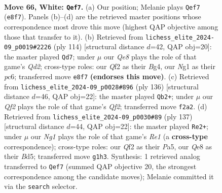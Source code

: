 \documentclass[11pt]{article}
\begin{document}
\clearpage

\begin{figure}[p]\centering
\begin{subfigure}{0.46\textwidth}\centering
\resizebox{\linewidth}{!}{%
\newchessgame
\chessboard[
  setfen={4Q3/8/p7/3P2kp/2N3p1/8/5Q2/5KN1 w - - 1 66},
  showmover=false,
  pgfstyle=straightmove, color=movearrow, markmove={e8-f7}
]}
\caption{}
\end{subfigure}\hfill
\begin{subfigure}{0.46\textwidth}\centering
\resizebox{\linewidth}{!}{%
\newchessgame
\chessboard[
  setfen={5b2/1p5P/1kp5/p5K1/P5B1/8/3Q4/8 w - - 1 58},
  showmover=false,
  pgfstyle=straightmove, color=movearrow, markmove={d2-d7}
]}
\caption{}
\end{subfigure}
\\[4pt]
\begin{subfigure}{0.46\textwidth}\centering
\resizebox{\linewidth}{!}{%
\newchessgame
\chessboard[
  setfen={8/1k4p1/5np1/8/P1q2P2/5N2/5QK1/8 w - - 21 69},
  showmover=false,
  pgfstyle=straightmove, color=movearrow, markmove={f2-b2}
]}
\caption{}
\end{subfigure}\hfill
\begin{subfigure}{0.46\textwidth}\centering
\resizebox{\linewidth}{!}{%
\newchessgame
\chessboard[
  setfen={4r3/8/8/p1kb4/3n1P2/1P6/PK5R/8 b - - 8 69},
  showmover=false,
  pgfstyle=straightmove, color=movearrow, markmove={e8-e2}
]}
\caption{}
\end{subfigure}
\caption{\textbf{Move 66, White: \texttt{Qef7}.} (a) Our position; Melanie plays \texttt{Qef7} (\texttt{e8f7}). Panels (b)--(d) are the retrieved master positions whose correspondence most drove this move (highest QAP objective among those that transfer to it). (b) Retrieved from \texttt{lichess\_elite\_2024-09\_p0019\#2226} (ply 114) [structural distance $d$=42, QAP obj=20]: the master played \texttt{Qd7}; under $\mu$ our \emph{Qe8} plays the role of that game's \emph{Qd2}; cross-type roles: our \emph{Q}f2 as their \emph{B}g4, our \emph{N}g1 as their \emph{p}c6; transferred move \texttt{e8f7} \textbf{(endorses this move)}. (c) Retrieved from \texttt{lichess\_elite\_2024-09\_p0028\#896} (ply 136) [structural distance $d$=46, QAP obj=22]: the master played \texttt{Qb2+}; under $\mu$ our \emph{Qf2} plays the role of that game's \emph{Qf2}; transferred move \texttt{f2a2}. (d) Retrieved from \texttt{lichess\_elite\_2024-09\_p0030\#89} (ply 137) [structural distance $d$=44, QAP obj=22]: the master played \texttt{Re2+}; under $\mu$ our \emph{Ng1} plays the role of that game's \emph{Re1} (a \textbf{cross-type} correspondence); cross-type roles: our \emph{Q}f2 as their \emph{P}a5, our \emph{Q}e8 as their \emph{B}d5; transferred move \texttt{g1h3}. Synthesis: 1 retrieved analog transferred to \texttt{Qef7} (summed QAP objective 20, the strongest correspondence among the candidate moves); Melanie committed it via the \texttt{search} selector.}
\label{fig:thought-m130}
\end{figure}
\end{document}
